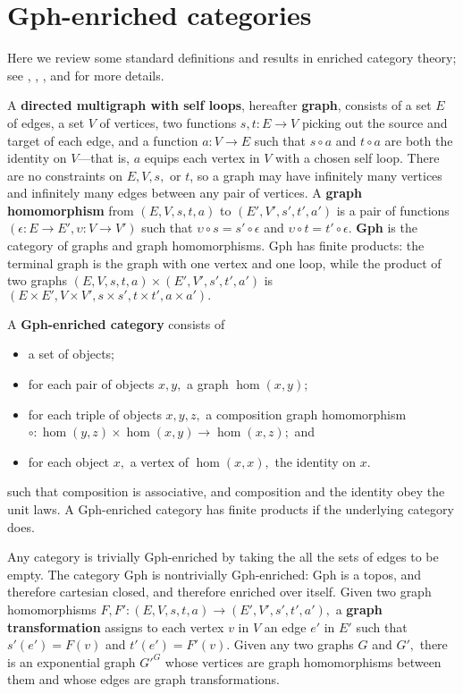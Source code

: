 \documentclass[a4paper,UKenglish]{lipics-v2016}
\newcommand{\maps}{\colon}
\begin{document}
\section{Gph-enriched categories}
Here we review some standard definitions and results in enriched category theory; see \cite{CIS-335497}, \cite{Power99EnrichedLawvereTheories}, \cite{DBLP:journals/acs/LackR11}, and \cite{Trimble} for more details.

A {\bf directed multigraph with self loops}, hereafter {\bf graph}, consists of a set $E$ of edges, a set $V$ of vertices, two functions $s,t\maps E \to V$ picking out the source and target of each edge, and a function $a\maps V \to E$ such that $s\circ a$ and $t \circ a$ are both the identity on $V$---that is, $a$ equips each vertex in $V$ with a chosen self loop.  There are no constraints on $E, V, s,$ or $t$, so a graph may have infinitely many vertices and infinitely many edges between any pair of vertices.  A {\bf graph homomorphism} from $(E, V, s, t, a)$ to $(E', V', s', t', a')$ is a pair of functions $(\epsilon\maps E \to E', \upsilon\maps V \to V')$ such that $\upsilon\circ s = s' \circ \epsilon$ and $\upsilon\circ t = t' \circ \epsilon$.  {\bf Gph} is the category of graphs and graph homomorphisms.  Gph has finite products: the terminal graph is the graph with one vertex and one loop, while the product of two graphs $(E, V, s, t, a) \times (E', V', s', t', a')$ is $(E \times E', V \times V', s \times s', t\times t', a \times a').$

A {\bf Gph-enriched category} consists of
\begin{itemize}
  \item a set of objects;
  \item for each pair of objects $x, y,$ a graph $\hom(x,y);$
  \item for each triple of objects $x, y, z,$ a composition graph homomorphism $\circ\maps \hom(y, z) \times \hom(x, y) \to \hom(x, z);$ and
  \item for each object $x,$ a vertex of $\hom(x, x),$ the identity on $x.$
\end{itemize}
such that composition is associative, and composition and the identity obey the unit laws.  A Gph-enriched category has finite products if the underlying category does.

Any category is trivially Gph-enriched by taking the all the sets of edges to be empty.  The category Gph is nontrivially Gph-enriched: Gph is a topos, and therefore cartesian closed, and therefore enriched over itself.  Given two graph homomorphisms $F, F'\maps (E, V, s, t, a) \to (E', V', s', t', a'),$ a {\bf graph transformation} assigns to each vertex $v$ in $V$ an edge $e'$ in $E'$ such that $s'(e') = F(v)$ and $t'(e') = F'(v).$  Given any two graphs $G$ and $G',$ there is an exponential graph $G'^G$ whose vertices are graph homomorphisms between them and whose edges are graph transformations.
\end{document}
